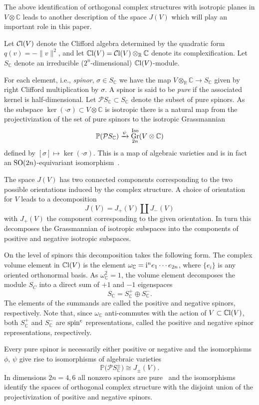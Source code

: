 \documentclass[pdftex]{sigma}%
\newcommand{\R}{\mathbb{R}}
\newcommand{\C}{\mathbb{C}}
\DeclareMathOperator{\Gr}{Gr}
\newcommand{\Cl}{\mathcal{C}{\rm l}}
\newcommand{\CCl}{\mathbb{C}{\rm l}}
\numberwithin{equation}{section}
\begin{document}
The above identification of orthogonal complex structures with isotropic planes in
$V\otimes \C$ leads to another description of the space $J(V)$ which will play an
important role in this paper.


Let $\Cl(V)$ denote the Clifford algebra determined by the quadratic form $q(v)=-\|v\|^2$, and let $\CCl(V)=\Cl(V)\otimes_\R \C$
denote its complexification. Let $S_{\C}$ denote an irreducible ($2^n$-dimensional) $\CCl(V)$-module.

For each element, i.e., \emph{spinor}, $\sigma \in S_{\C}$ we have the map $V\otimes_\R \C \to S_{\C}$ given by right Clifford multiplication by $\sigma$. A spinor is said to be \emph{pure} if the associated kernel is half-dimensional. Let ${\mathcal P}S _{\C} \subset S_\C$ denote the subset of pure spinors. As the subspace $\ker (\cdot \sigma) \subset V\otimes \C$ is isotropic
there is a natural map from the projectivization of the set of pure spinors to the isotropic Grassmannian
\[
\mathbb{P}( {\mathcal P}S _\C ) \xrightarrow{\psi} \Gr^{\rm Iso}_{2n}(V\otimes \C)
\]
defined by $[\sigma] \mapsto \ker (\cdot \sigma)$. This is a map of algebraic varieties and is in fact an ${\rm SO}(2n)$-equivariant isomorphism~\cite[Proposition~IV.9.7]{LM}.

The space $J(V)$ has two connected components corresponding to the two possible orientations induced by the complex structure. A choice of orientation for $V$ leads to a decomposition
\[J(V) = J_+(V) \coprod J_-(V)\]
with $J_+(V)$ the component corresponding to the given orientation. In turn this decomposes the Grassmannian of isotropic subspaces into the components of positive and negative isotropic subspaces.

On the level of spinors this decomposition takes the following form.
The complex volume element in $\CCl(V)$ is the element
$\omega_\C = {\rm i}^n e_1 \cdots e_{2n}$, where
$\{e_i\}$ is any oriented orthonormal basis. As $\omega_{\C}^2=1$, the volume element decomposes
the module $S_C$ into a direct sum of $+1$ and $-1$ eigenspaces
\[
S_\C = S_\C^+ \oplus S_\C^-.
\]
The elements of the summands are called the positive and negative spinors, respectively.
Note that, since $\omega_\C$ anti-commutes with the action of $V \subset \CCl(V)$, both
$S_\C^+$ and $S_\C^-$ are ${\rm spin}^{\rm c}$ representations, called the positive and negative spinor representations, respectively.

Every pure spinor is necessarily either positive or negative and the isomorphisms $\phi$, $\psi$ give rise to isomorphisms of algebraic varieties
\[
\mathbb{P}\big({\mathcal P}S _\C^\pm\big) \cong J_\pm(V).
\]
In dimensions $2n=4,6$ all nonzero spinors are pure~\cite[Remark~IV.9.12]{LM} and the isomorphisms identify the spaces
of orthogonal complex structure with the disjoint union of the projectivization of positive
and negative spinors.
\end{document}

